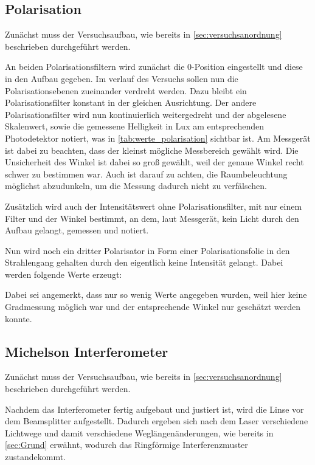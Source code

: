 \documentclass[12pt,english,ngerman]{scrartcl}
\begin{document}
\subsection{Polarisation}

Zunächst muss der Versuchsaufbau, wie bereits in \autoref{sec:versuchsanordnung} beschrieben durchgeführt werden.

An beiden Polarisationsfiltern wird zunächst die 0-Position eingestellt und diese in den Aufbau gegeben.
Im verlauf des Versuchs sollen nun die Polarisationsebenen zueinander verdreht werden. Dazu bleibt ein Polarisationsfilter 
konstant in der gleichen Ausrichtung. Der andere Polarisationsfilter wird nun kontinuierlich weitergedreht und der 
abgelesene Skalenwert, sowie die gemessene Helligkeit in Lux am entsprechenden Photodetektor notiert, was in 
\autoref{tab:werte_polarisation} sichtbar ist. Am Messgerät ist dabei zu beachten, dass der kleinst mögliche Messbereich
gewählt wird. Die Unsicherheit des Winkel ist dabei so groß gewählt, weil der genaue Winkel recht schwer zu bestimmen war.
Auch ist darauf zu achten, die Raumbeleuchtung möglichst abzudunkeln, um die Messung dadurch nicht zu verfälschen.


Zusätzlich wird auch der Intensitätswert ohne Polarisationsfilter, mit nur einem Filter und der Winkel bestimmt, an dem, 
laut Messgerät, kein Licht durch den Aufbau gelangt, gemessen und notiert.


Nun wird noch ein dritter Polarisator in Form einer Polarisationsfolie in den Strahlengang gehalten durch den eigentlich keine
Intensität gelangt. Dabei werden folgende Werte erzeugt:


Dabei sei angemerkt, dass nur so wenig Werte angegeben wurden, weil hier keine Gradmessung möglich war und der entsprechende 
Winkel nur geschätzt werden konnte.


\subsection{Michelson Interferometer}

Zunächst muss der Versuchsaufbau, wie bereits in \autoref{sec:versuchsanordnung} beschrieben durchgeführt werden.

Nachdem das Interferometer fertig aufgebaut und justiert ist, wird die Linse vor dem Beamsplitter aufgestellt. Dadurch ergeben 
sich nach dem Laser verschiedene Lichtwege und damit verschiedene Weglängenänderungen, wie bereits in \autoref{sec:Grund} 
erwähnt, wodurch das Ringförmige Interferenzmuster zustandekommt.
\end{document}
